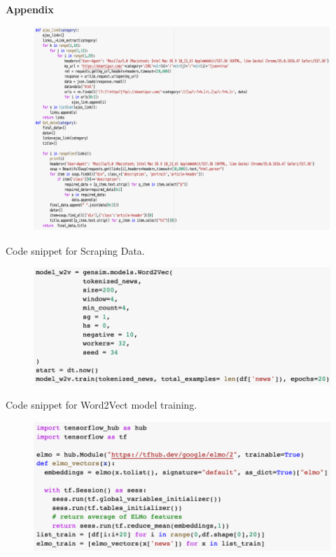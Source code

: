 \textbf{\LARGE Appendix}\\[0.5cm] 
\begin{figure}[H]
	\centering 
	\vspace{5pt}\includegraphics[width=15cm]{images/Data_scrap.png}
\end{figure}
\centering 
[A] Code snippet for Scraping Data.
\begin{figure}[H]
	\centering 
	\vspace{5pt}\includegraphics[width=15cm]{images/Word2Vec_model_train.png}
\end{figure}
\centering 
[B] Code snippet for Word2Vect model training.
\begin{figure}[H]
	\centering 
	\vspace{5pt}\includegraphics[width=15cm]{images/ELMO_model_train.png}
\end{figure}
